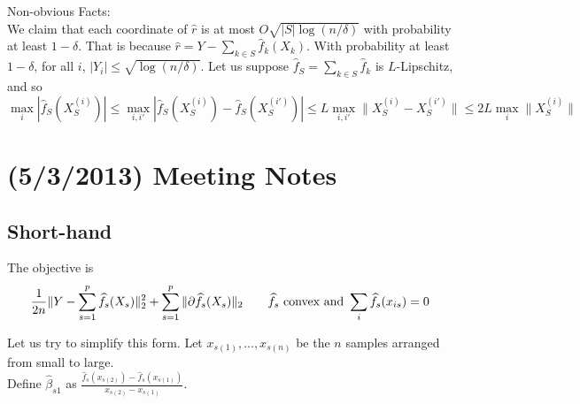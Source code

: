 \documentclass{article}
\begin{document}
Non-obvious Facts:\\
We claim that each coordinate of $\hat{r}$ is at most $O\sqrt{|S| \log(n/\delta)}$ with probability at least $1-\delta$. That is because $\hat{r} = Y - \sum_{k \in S} \hat{f}_k (X_k)$. With probability at least $1-\delta$, for all $i$, $|Y_i | \leq \sqrt{\log(n/\delta)}$. Let us suppose $\hat{f}_S = \sum_{k \in S} \hat{f}_k$ is $L$-Lipschitz, and so 
\[
\max_i | \hat{f}_S(X_S^{(i)})| \leq \max_{i,i'} | \hat{f}_S(X_S^{(i)}) - \hat{f}_S(X_S^{(i')}) | \leq L \max_{i,i'} \| X_S^{(i)} - X_S^{(i')} \| \leq 2L \max_i \| X_S^{(i)} \|
\]







\newpage

\section{(5/3/2013) Meeting Notes}

\subsection{Short-hand}

The objective is
\[
\frac{1}{2n} \| Y - \sum_{s=1}^p \widehat{f}_s(X_s) \|_2^2 + \sum_{s=1}^p \| \partial \widehat{f}_s(X_s)\|_2 \qquad \widehat{f}_s \textrm{ convex and } \sum_i \widehat{f}_s (x_{is}) = 0
\]

Let us try to simplify this form. Let $x_{s(1)} ,..., x_{s(n)}$ be the $n$ samples arranged from small to large.\\

Define $\hat{\beta}_{s1}$ as $\frac{\hat{f}_s(x_{s(2)}) - \hat{f}_s(x_{s(1)})}{x_{s(2)} - x_{s(1)}}$.\\
\end{document}
